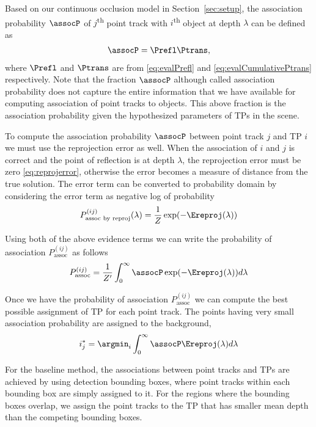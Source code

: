Based on our continuous occlusion model in Section~\ref{sec:setup}, the association probability $\assocP$ of $j$\textsuperscript{th} point track with $i$\textsuperscript{th} object at depth $\lambda$ can be defined as
\begin{align}
  \assocP = \Prefl\Ptrans,
\end{align}
where $\Prefl$ and $\Ptrans$ are from \eqref{eq:evalPrefl} and \eqref{eq:evalCumulativePtrans} respectively. Note that the fraction $\assocP$ although called association probability does not capture the entire information that we have available for computing association of point tracks to objects. This above fraction is the association probability given the hypothesized parameters of TPs in the scene. 

To compute the association probability $\assocP$ between point track $j$ and TP $i$ we must use the reprojection error as well. When the association of $i$ and $j$ is correct and the point of reflection is at depth $\lambda$, the reprojection error must be zero \eqref{eq:reprojerror}, otherwise the error becomes a measure of distance from the true solution. The error term can be converted to probability domain by considering the error term as negative log of probability
\begin{align}
  P^{(ij)}_{\text{assoc by reproj}}(\lambda) = \frac{1}{Z}\exp(-\Ereproj(\lambda))
\end{align}

Using both of the above evidence terms we can write the probability of association $P^{(ij)}_{\text{assoc}}$ as follows
\begin{align}
  P^{(ij)}_{\text{assoc}} = \frac{1}{Z'}\int_0^{\infty} \assocP \exp(-\Ereproj(\lambda))d\lambda
  \label{eq:prob-assoc}
\end{align}

Once we have the probability of association $P^{(ij)}_{\text{assoc}}$ we can compute the best possible assignment of TP for each point track. The points having very small association probability are assigned to the background,
\begin{align}
  i^*_{j} = \argmin_{i} \int_0^\infty \assocP \Ereproj(\lambda) d\lambda
\end{align}

For the baseline method, the associations between point tracks and TPs are achieved by using detection bounding boxes, where point tracks within each bounding box are simply assigned to it. For the regions where the bounding boxes overlap, we assign the point tracks to the TP that has smaller mean depth than the competing bounding boxes.

